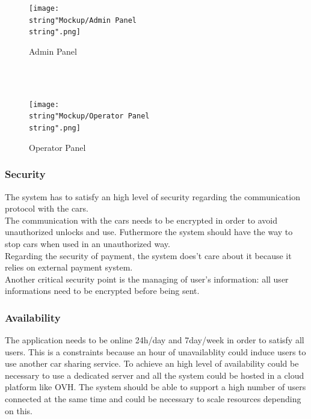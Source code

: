\begin{center}
\begin{figure}[H]
\texttt{[image: \\string"Mockup/Admin Panel\\string".png]}

\caption{Admin Panel}

\end{figure}
\\
\\
\begin{figure}[H]

\texttt{[image: \\string"Mockup/Operator Panel\\string".png]}

\caption{Operator Panel}

\end{figure}
\par\end{center}

\subsubsection{Security}

The system has to satisfy an high level of security regarding the
communication protocol with the cars.\\
The communication with the cars needs to be encrypted in order to
avoid unauthorized unlocks and use. Futhermore the system should have
the way to stop cars when used in an unauthorized way.\\
Regarding the security of payment, the system does't care about it
because it relies on external payment system.\\
Another critical security point is the managing of user's information:
all user informations need to be encrypted before being sent. 

\subsubsection{Availability}

The application needs to be online 24h/day and 7day/week in order
to satisfy all users. This is a constraints because an hour of unavailablity
could induce users to use another car sharing service. To achieve
an high level of availability could be necessary to use a dedicated
server and all the system could be hosted in a cloud platform like
OVH. The system should be able to support a high number of users connected
at the same time and could be necessary to scale resources depending
on this. 

